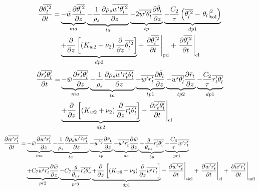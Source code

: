 \documentclass[11pt,fleqn]{article}
\newcommand{\ptlder}[2]{\frac{\partial #1}{\partial #2}}
\newcommand{\inverse}[1]{\frac{1}{#1}}
\begin{document}
\begin{equation}
\label{eq_thlp2}
\begin{split}
\ptlder{\overline{\theta_l^{'2}}}{t}
=& \underbrace{ - \bar{w}\ptlder{\overline{\theta^{'2}_l}}{z} }_{ma}
   \underbrace{ - \inverse{\rho_{s}}\ptlder{\rho_{s}\overline{w'\theta_l^{'2}}}{z} }_{ta}
   \underbrace{ - 2\overline{w'\theta'_l}\ptlder{\bar{\theta}_l}{z} }_{tp}
   \underbrace{ - \dfrac{C_2}{\tau} \left(   \overline{\theta_l^{'2}} 
                              - \left. \theta_l \right|_{\rm{tol}}^{2} \right) }_{dp1} \\
 & \underbrace{ + \ptlder{}{z} \left[ \left( K_{w2} + \nu_2 \right)
                         \ptlder{}{z} \overline{\theta_l^{'2}}
                  \right] }_{dp2}
   + \left. \ptlder{\overline{\theta_l^{'2}}}{t} \right|_{\rm{pd}}
   + \left. \ptlder{\overline{\theta_l^{'2}}}{t} \right|_{\rm{cl}}
\end{split}
\end{equation}
%
\begin{equation}
\label{eq_rtpthlp}
\begin{split}
\ptlder{\overline{r'_t\theta'_l}}{t}
= & \underbrace{ - \bar{w}\ptlder{\overline{r'_t\theta'_l}}{z} }_{ma}
    \underbrace{ - \inverse{\rho_{s}}\ptlder{\rho_{s}\overline{w'r'_t\theta'_l}}{z} }_{ta}
    \underbrace{ - \overline{w'r'_t}\ptlder{\bar{\theta}_l}{z} }_{tp1}
    \underbrace{ - \overline{w'\theta'_l}\ptlder{\bar{r}_t}{z} }_{tp2}
    \underbrace{ - \dfrac{C_2}{\tau} \overline{r_t' \theta_l'} }_{dp1} \\
    & \underbrace{ + \ptlder{}{z} \left[ \left( K_{w2} + \nu_2 \right)
                            \ptlder{}{z} \overline{r_t' \theta_l'} 
                     \right] }_{dp2}
    + \left. \ptlder{\overline{r'_t\theta'_l}}{t} \right|_{\rm{cl}}
\end{split}
\end{equation}
%
\begin{equation}
\label{eq_wprtp}
\begin{split}
\ptlder{\overline{w'r'_t}}{t} 
= & \underbrace{ - \bar{w}\ptlder{\overline{w'r'_t}}{z} }_{ma}
    \underbrace{ - \inverse{\rho_{s}}\ptlder{\rho_{s}\overline{w^{'2}r'_t}}{z} }_{ta}
    \underbrace{ - \overline{w^{'2}}\ptlder{\bar{r}_t}{z} }_{tp}
    \underbrace{ - \overline{w'r'_t}\ptlder{\bar{w}}{z} }_{ac}
    \underbrace{ + \frac{g}{\theta_{vs}} \overline{r'_t\theta'_v} }_{bp}
    \underbrace{ - \frac{C_6}{\tau}\overline{w'r'_t} }_{pr1} \\
  & \underbrace{ + C_7 \overline{w'r'_t}\ptlder{\bar{w}}{z} }_{pr2}
    \underbrace{ - C_7 \frac{g}{\theta_{vs}} \overline{r'_t\theta'_v} }_{pr3}
    \underbrace{ + \ptlder{}{z} \left[ \left( K_{w6} + \nu_6 \right)
                          \ptlder{}{z} \overline{w'r'_t} 
                   \right] }_{dp1}
    + \left. \ptlder{\overline{w'r'_t}}{t} \right|_{\rm{sicl}}
    + \left. \ptlder{\overline{w'r'_t}}{t} \right|_{\rm{cl}}
    + \left. \ptlder{\overline{w'r'_t}}{t} \right|_{\rm{mfl}}
\end{split}
\end{equation}
\end{document}
